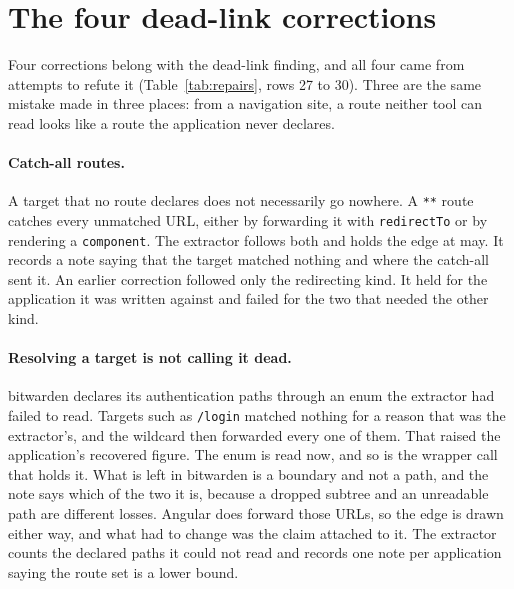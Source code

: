 \begin{table}[t]\small
\caption{Why each remaining site is not a transition. The script that produces this table
fails if any site has no reason.}
\label{tab:round2reasons}
\TabRoundTwoReasons
\end{table}

\section{The four dead-link corrections}
\label{app:deadlinkfixes}

Four corrections belong with the dead-link finding, and all four came from attempts to refute it (Table~\ref{tab:repairs}, rows 27 to 30). Three are the same mistake made in three places: from a navigation site, a route neither tool can read looks like a route the application never declares.

\paragraph{Catch-all routes.} A target that no route declares does not necessarily go nowhere. A \texttt{**} route catches every unmatched URL, either by forwarding it with \texttt{redirectTo} or by rendering a \texttt{component}. The extractor follows both and holds the edge at may. It records a note saying that the target matched nothing and where the catch-all sent it. An earlier correction followed only the redirecting kind. It held for the application it was written against and failed for the two that needed the other kind.

\paragraph{Resolving a target is not calling it dead.} bitwarden declares its authentication paths through an enum the extractor had failed to read. Targets such as \texttt{/login} matched nothing for a reason that was the extractor's, and the wildcard then forwarded every one of them. That raised the application's recovered figure. The enum is read now, and so is the wrapper call that holds it. What is left in bitwarden is a boundary and not a path, and the note says which of the two it is, because a dropped subtree and an unreadable path are different losses. Angular does forward those URLs, so the edge is drawn either way, and what had to change was the claim attached to it. The extractor counts the declared paths it could not read and records one note per application saying the route set is a lower bound.


